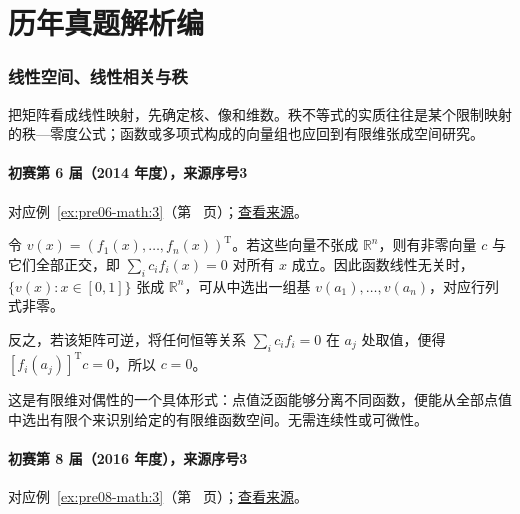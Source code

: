 \documentclass[12pt,fontset=fandol]{ctexart}
\begin{document}
\part{历年真题解析编}

\section{线性空间、线性相关与秩}

\label{sec:solutions-1}

把矩阵看成线性映射，先确定核、像和维数。秩不等式的实质往往是某个限制映射的秩—零度公式；函数或多项式构成的向量组也应回到有限维张成空间研究。

\subsection{初赛第 6 届（2014 年度），来源序号3}\label{ans:pre06-math:3}\label{pr:pre06-math:3}

对应例~\ref{ex:pre06-math:3}（第~\pageref{ex:pre06-math:3} 页）；\href{https://github.com/lzxcr/cmc-mathematics/blob/64916fa1fdbc3e444a652eca204d5669058ee321/src/problems/preliminary/06/03.md}{查看来源}。

\begin{solve}

令 $v(x)=(f_1(x),\ldots,f_n(x))^{\mathrm T}$。若这些向量不张成 $\mathbb R^n$，则有非零向量 $c$ 与它们全部正交，即 $\sum_ic_if_i(x)=0$ 对所有 $x$ 成立。因此函数线性无关时，$\{v(x):x\in[0,1]\}$ 张成 $\mathbb R^n$，可从中选出一组基 $v(a_1),\ldots,v(a_n)$，对应行列式非零。

反之，若该矩阵可逆，将任何恒等关系 $\sum_ic_if_i=0$ 在 $a_j$ 处取值，便得 $[f_i(a_j)]^{\mathrm T}c=0$，所以 $c=0$。

\end{solve}

\begin{remark}[方法与条件]

这是有限维对偶性的一个具体形式：点值泛函能够分离不同函数，便能从全部点值中选出有限个来识别给定的有限维函数空间。无需连续性或可微性。

\end{remark}

\subsection{初赛第 8 届（2016 年度），来源序号3}\label{ans:pre08-math:3}\label{pr:pre08-math:3}

对应例~\ref{ex:pre08-math:3}（第~\pageref{ex:pre08-math:3} 页）；\href{https://github.com/lzxcr/cmc-mathematics/blob/64916fa1fdbc3e444a652eca204d5669058ee321/src/problems/preliminary/08/03.md}{查看来源}。
\end{document}
